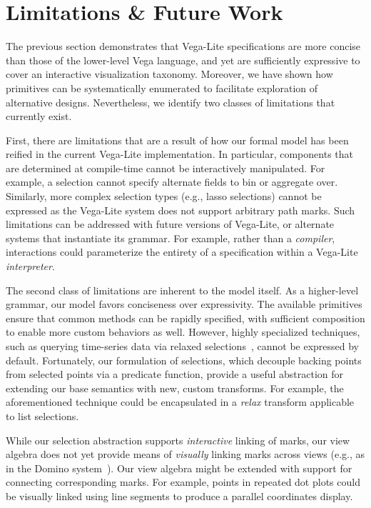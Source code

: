 \section{Limitations \& Future Work}
\label{sec:vl:conclusion}

The previous section demonstrates that Vega-Lite specifications are more concise
than those of the lower-level Vega language, and yet are sufficiently expressive
to cover an interactive visualization taxonomy. Moreover, we have shown how
primitives can be systematically enumerated to facilitate exploration of
alternative designs. Nevertheless, we identify two classes of limitations that
currently exist.

First, there are limitations that are a result of how our formal model has been
reified in the current Vega-Lite implementation. In particular, components that
are determined at compile-time cannot be interactively manipulated. For example,
a selection cannot specify alternate fields to bin or aggregate over. Similarly,
more complex selection types (e.g., lasso selections) cannot be expressed as the
Vega-Lite system does not support arbitrary path marks. Such limitations can be
addressed with future versions of Vega-Lite, or alternate systems that
instantiate its grammar. For example, rather than a \emph{compiler},
interactions could parameterize the entirety of a specification within a
Vega-Lite \emph{interpreter}.

The second class of limitations are inherent to the model itself. As a
higher-level grammar, our model favors conciseness over expressivity. The
available primitives ensure that common methods can be rapidly specified, with
sufficient composition to enable more custom behaviors as well. However, highly
specialized techniques, such as querying time-series data via relaxed
selections~\cite{holz:relaxed}, cannot be expressed by default. Fortunately, our
formulation of selections, which decouple backing points from selected points
via a predicate function, provide a useful abstraction for extending our base
semantics with new, custom transforms. For example, the aforementioned technique
could be encapsulated in a \emph{relax} transform applicable to list selections.

While our selection abstraction supports \emph{interactive} linking of marks,
our view algebra does not yet provide means of \emph{visually} linking marks
across views (e.g., as in the Domino system~\cite{gratzl:domino}). Our view
algebra might be extended with support for connecting corresponding marks. For
example, points in repeated dot plots could be visually linked using line
segments to produce a parallel coordinates display.

